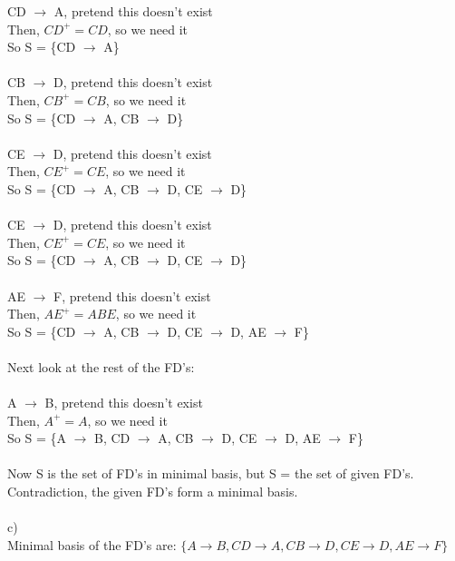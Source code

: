 \documentclass{article}
\begin{document}
\begin{enumerate}
    CD $\rightarrow$ A, pretend this doesn't exist\\
    Then, $CD^{+}=CD$,  so we need it\\
    So S = \{CD $\rightarrow$ A\}\\\\
    CB $\rightarrow$ D, pretend this doesn't exist\\
    Then, $CB^{+}=CB$, so we need it\\
    So S = \{CD $\rightarrow$ A, CB $\rightarrow$ D\}\\\\
    CE $\rightarrow$ D, pretend this doesn't exist\\
    Then, $CE^{+}=CE$, so we need it\\
    So S = \{CD $\rightarrow$ A, CB $\rightarrow$ D, CE $\rightarrow$ D\}\\\\
    CE $\rightarrow$ D, pretend this doesn't exist\\
    Then, $CE^{+}=CE$, so we need it\\
    So S = \{CD $\rightarrow$ A, CB $\rightarrow$ D, CE $\rightarrow$ D\}\\\\
    AE $\rightarrow$ F, pretend this doesn't exist\\
    Then, $AE^{+}=ABE$, so we need it\\
    So S = \{CD $\rightarrow$ A, CB $\rightarrow$ D, CE $\rightarrow$ D, AE $\rightarrow$ F\}\\\\
    Next look at the rest of the FD's:\\\\
    A $\rightarrow$ B, pretend this doesn't exist\\
    Then, $A^{+}=A$, so we need it\\
    So S = \{A $\rightarrow$ B, CD $\rightarrow$ A, CB $\rightarrow$ D, CE $\rightarrow$ D, AE $\rightarrow$ F\}\\\\
  	Now S is the set of FD's in minimal basis, but S = the set of given FD's.\\
  	Contradiction, the given FD’s form a minimal basis.
    \\
    \\
    c) \\ 
    Minimal basis of the FD's are: $\{A\rightarrow B, CD\rightarrow A, CB\rightarrow D, CE\rightarrow D, AE\rightarrow F \}$
    \\ \\

\end{enumerate}
\end{document}
